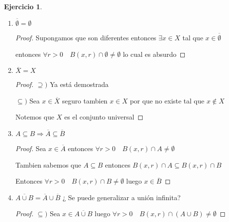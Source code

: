 \documentclass[12pt]{article}
\newcommand{\Ra}{\Rightarrow}
\newcommand{\ol}{\overline}
\theoremstyle{definition}
\newtheorem{ej}{Ejercicio}
\begin{document}
\begin{ej}
\begin{enumerate}
\begin{enumerate}
\begin{proof}
	    Entonces $x \in \ol F = F$

	    Y esto vale para cualquier $F$ cerrado tal que $A \subseteq F$

	    Entonces $x$ esta en todos estos $F$ y por ende en la intersección

	$\supseteq )$ Sea $x \in \bigcap F$ entonces $x \in F$ para todo $F = \ol F$ por que es cerrado por lo tanto $x \in \ol F$

	Supongamos que $x \in \bigcap F$ pero $x \notin \ol A$ entonces tiene que existir un $r>0$ tal que $B(x,r) \cap A = \emptyset$ luego tenemos que $A \subseteq X \setminus B(x,r)$ que ademas es cerrado por que es el complemento de $B(x,r)$ que es abierto

	Pero entonces $X \setminus B(x,r)$ es un cerrado que contiene a $A$ por ende es uno de los $F$ en la intersección

	Entonces $x \in X \setminus B(x,r)$ lo cual es absurdo

	Provino de suponer que existia un $r>0$ tal que $B(x,r) \cap A = \emptyset$

	Entonces $\forall r>0 \quad B(x,r) \cap A \neq \emptyset$ por lo tanto $x \in \ol A$
	  \end{proof}
	\item $\ol \emptyset = \emptyset$
	  \begin{proof}
	    Supongamos que son diferentes entonces $\exists x \in X$ tal que $x \in \ol \emptyset$

	    entonces $\forall r>0 \quad B(x,r) \cap \emptyset \neq \emptyset$ lo cual es absurdo
	  \end{proof}
	\item $\ol X = X$
	  \begin{proof}
	  $\supseteq )$ Ya está demostrada

	$\subseteq ) $ Sea $x \in \ol X$ seguro tambien $x \in X$ por que no existe tal que $x \notin X$

	Notemos que $X$ es el conjunto universal
	  \end{proof}
	\item $A \subseteq B \Ra \ol A \subseteq \ol B$
	  \begin{proof}
	    Sea $x \in \ol A$ entonces $\forall r>0 \quad B(x,r) \cap A \neq \emptyset$

	    Tambien sabemos que $A \subseteq B$ entonces $B(x,r) \cap A \subseteq B(x,r) \cap B$

	    Entonces $\forall r>0 \quad B(x,r) \cap B \neq \emptyset$ luego $x \in \ol B$
	  \end{proof}
	\item $\ol{A \cup B} = \ol A \cup \ol B$ ¿ Se puede generalizar a unión infinita?
	  \begin{proof}
	$\subseteq ) $ Sea $x \in \ol{A \cup B}$ luego $\forall r>0 \quad B(x,r) \cap (A \cup B) \neq \emptyset$


\end{proof}
\end{enumerate}
\end{enumerate}
\end{ej}
\end{document}
